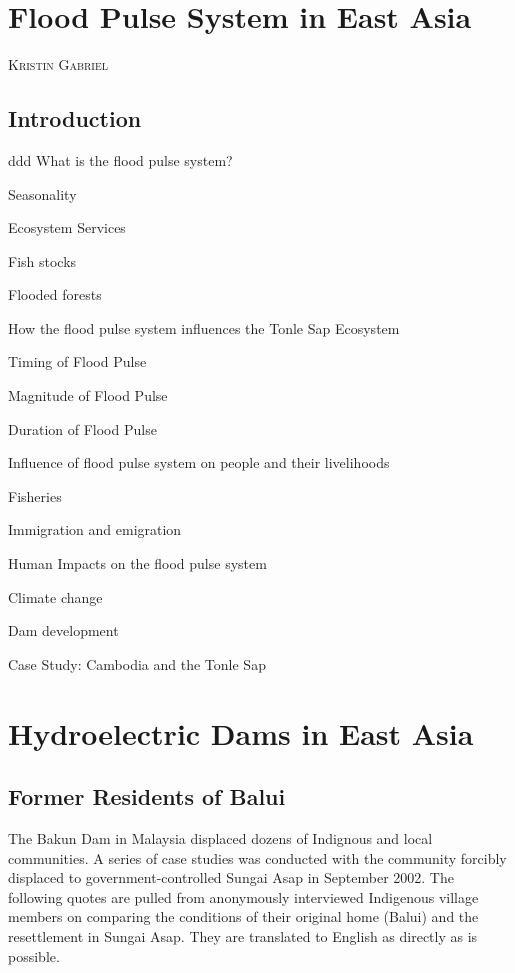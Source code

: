 \documentclass{book}\usepackage{knitr}
\makeatletter
\newcommand{\chapterauthor}[1]{%
  {\parindent0pt\vspace*{-25pt}%
  \linespread{1.1}\large\scshape#1%
  \par\nobreak\vspace*{35pt}}
  \@afterheading%
}
\makeatother
\begin{document}
{\chapter{Flood Pulse System in East Asia}\label{ch:floodpulse}

\chapterauthor{Kristin Gabriel}

\section{Introduction}
ddd
What is the flood pulse system?

Seasonality

Ecosystem Services

Fish stocks

Flooded forests

How the flood pulse system influences the Tonle Sap Ecosystem

Timing of Flood Pulse

Magnitude of Flood Pulse

Duration of Flood Pulse

Influence of flood pulse system on people and their livelihoods

Fisheries

Immigration and emigration

Human Impacts on the flood pulse system

Climate change

Dam development

Case Study: Cambodia and the Tonle Sap


\chapter{Hydroelectric Dams in East Asia}

\section{Former Residents of Balui}
The Bakun Dam in Malaysia displaced dozens of Indignous and local communities. A series of case studies was conducted with the community forcibly displaced to government-controlled Sungai Asap in September 2002. The following quotes are pulled from anonymously interviewed Indigenous village members on comparing the conditions of their original home (Balui) and the resettlement in Sungai Asap. They are translated to English as directly as is possible. 


}
\end{document}
